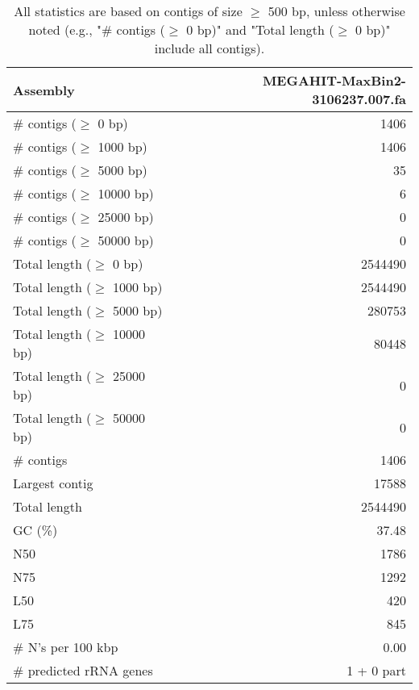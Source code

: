 \documentclass[12pt,a4paper]{article}
\begin{document}
\begin{table}[ht]
\begin{center}
\caption{All statistics are based on contigs of size $\geq$ 500 bp, unless otherwise noted (e.g., "\# contigs ($\geq$ 0 bp)" and "Total length ($\geq$ 0 bp)" include all contigs).}
\begin{tabular}{|l*{1}{|r}|}
\hline
Assembly & MEGAHIT-MaxBin2-3106237.007.fa \\ \hline
\# contigs ($\geq$ 0 bp) & 1406 \\ \hline
\# contigs ($\geq$ 1000 bp) & 1406 \\ \hline
\# contigs ($\geq$ 5000 bp) & 35 \\ \hline
\# contigs ($\geq$ 10000 bp) & 6 \\ \hline
\# contigs ($\geq$ 25000 bp) & 0 \\ \hline
\# contigs ($\geq$ 50000 bp) & 0 \\ \hline
Total length ($\geq$ 0 bp) & 2544490 \\ \hline
Total length ($\geq$ 1000 bp) & 2544490 \\ \hline
Total length ($\geq$ 5000 bp) & 280753 \\ \hline
Total length ($\geq$ 10000 bp) & 80448 \\ \hline
Total length ($\geq$ 25000 bp) & 0 \\ \hline
Total length ($\geq$ 50000 bp) & 0 \\ \hline
\# contigs & 1406 \\ \hline
Largest contig & 17588 \\ \hline
Total length & 2544490 \\ \hline
GC (\%) & 37.48 \\ \hline
N50 & 1786 \\ \hline
N75 & 1292 \\ \hline
L50 & 420 \\ \hline
L75 & 845 \\ \hline
\# N's per 100 kbp & 0.00 \\ \hline
\# predicted rRNA genes & 1 + 0 part \\ \hline
\end{tabular}
\end{center}
\end{table}
\end{document}
